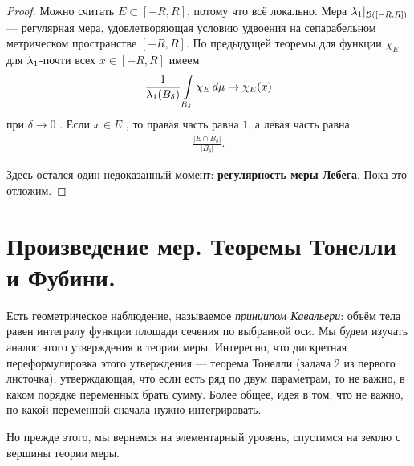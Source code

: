 \begin{proof}
 Можно считать $E \subset [-R, R]$, потому что всё локально. Мера $\lambda_{1} \rvert_{\mathcal{B}([-R, R])}$  --- регулярная мера, удовлетворяющая условию удвоения на сепарабельном метрическом пространстве $[-R,R]$. По предыдущей теоремы для функции $\chi_E$ для  $\lambda_{1}$-почти всех $x \in [-R, R]$  имеем \begin{align*}
  \frac{1}{\lambda_{1}(B_{\delta})} \int\limits_{B_{\delta}} \chi_E \, d\mu  \to \chi_E(x)
 \end{align*} при $\delta \to 0$ . Если $x \in E$ , то правая часть равна $1$, а левая часть равна \begin{align*}
  \frac{\left| E \cap B_{\delta} \right|}{\left| B_{\delta} \right|}
 .\end{align*}

 Здесь остался один недоказанный момент: \textbf{регулярность меры Лебега}. Пока это отложим.
\end{proof}

\section{Произведение мер. Теоремы Тонелли и Фубини.}

Есть геометрическое наблюдение, называемое \textit{принципом Кавальери}: объём тела равен интегралу функции площади сечения по выбранной оси. Мы будем изучать аналог этого утверждения в теории меры. Интересно, что дискретная переформулировка этого утверждения --- теорема Тонелли (задача 2 из первого листочка), утверждающая, что если есть ряд по двум параметрам, то не важно, в каком порядке переменных брать сумму. Более общее, идея в том, что не важно, по какой переменной сначала нужно интегрировать.

Но прежде этого, мы вернемся на элементарный уровень, спустимся на землю с вершины теории меры.


